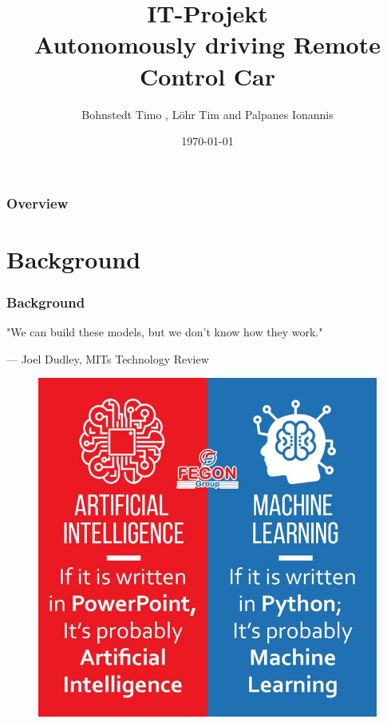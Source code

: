\documentclass{beamer}
\title{IT-Projekt \\ Autonomously driving Remote Control Car} %
\author{Bohnstedt Timo ,
      L\"ohr Tim and Palpanes Ionannis\\%
      }
\institute[Computer Science| Prof. Dr. Florian Gallwitz] %
{
Georg Simon Ohm University of Applied Science\\ %
\medskip
\textit{IT Project Presentation} 
}
\date{\today} %
\begin{document}
\begin{frame}
\titlepage %
\end{frame}
\begin{frame}
\frametitle{Overview} %
\tableofcontents %
\end{frame}
%
\section{Background}
%
\begin{frame}
\frametitle{Background}
\epigraph{"We can build these models, but we don't know how they work."}{--- \textup{ Joel Dudley}, MITs Technology Review}
\begin{figure}
\includegraphics[width=0.4\linewidth]{photo/aivsml}
\end{figure}
\end{frame}
%
\end{document}
